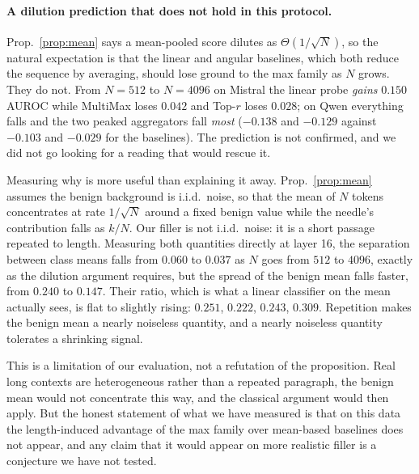 \documentclass[10pt]{article}
\theoremstyle{plain}
\theoremstyle{definition}
\theoremstyle{remark}
\begin{document}
\paragraph{A dilution prediction that does not hold in this protocol.} Prop.~\ref{prop:mean}
says a mean-pooled score dilutes as $\Theta(1/\sqrt N)$, so the natural expectation is
that the linear and angular baselines, which both reduce the sequence by averaging, should
lose ground to the max family as $N$ grows. They do not. From $N{=}512$ to $N{=}4096$ on
Mistral the linear probe \emph{gains} $0.150$ AUROC while MultiMax loses $0.042$ and
Top-$r$ loses $0.028$; on Qwen everything falls and the two peaked aggregators fall
\emph{most} ($-0.138$ and $-0.129$ against $-0.103$ and $-0.029$ for the baselines). The
prediction is not confirmed, and we did not go looking for a reading that would rescue it.

Measuring why is more useful than explaining it away. Prop.~\ref{prop:mean} assumes the
benign background is i.i.d.\ noise, so that the mean of $N$ tokens concentrates at rate
$1/\sqrt N$ around a fixed benign value while the needle's contribution falls as $k/N$.
Our filler is not i.i.d.\ noise: it is a short passage repeated to length. Measuring both
quantities directly at layer 16, the separation between class means falls from $0.060$ to
$0.037$ as $N$ goes from $512$ to $4096$, exactly as the dilution argument requires, but
the spread of the benign mean falls faster, from $0.240$ to $0.147$. Their ratio, which is
what a linear classifier on the mean actually sees, is flat to slightly rising: $0.251$,
$0.222$, $0.243$, $0.309$. Repetition makes the benign mean a nearly noiseless quantity,
and a nearly noiseless quantity tolerates a shrinking signal.

This is a limitation of our evaluation, not a refutation of the proposition. Real long
contexts are heterogeneous rather than a repeated paragraph, the benign mean would not
concentrate this way, and the classical argument would then apply. But the honest
statement of what we have measured is that on this data the length-induced advantage of
the max family over mean-based baselines does not appear, and any claim that it would
appear on more realistic filler is a conjecture we have not tested.
\end{document}
